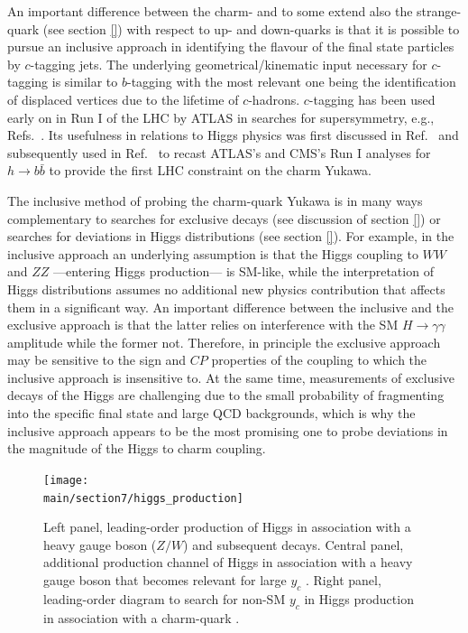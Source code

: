 \documentclass[../report.tex]{subfiles}
\providecommand{\main}{..}
\begin{document}
An important difference between the charm- and to some extend also 
the strange-quark (see section \ref{}) with respect to up- and 
down-quarks is that it is possible to pursue an inclusive approach in
identifying the flavour of the final state particles by $c$-tagging jets.
The underlying geometrical/kinematic input necessary for $c$-tagging
is similar to $b$-tagging with the most relevant one being the identification
of displaced vertices due to the lifetime of $c$-hadrons.
$c$-tagging has been used early on in Run I of the LHC by ATLAS in 
searches for supersymmetry, e.g., Refs.~\cite{Aad:2014nra,Aad:2015gna}.
Its usefulness in relations to Higgs physics was first discussed 
in Ref.~\cite{Delaunay:2013pja} and subsequently
used in Ref.~\cite{Perez:2015aoa} to recast ATLAS's and CMS's Run I 
analyses for $h\to b\bar b$ to provide the first LHC 
constraint on the charm Yukawa. 

The inclusive method of probing the charm-quark Yukawa is in many ways complementary 
to searches for exclusive decays (see discussion of section \ref{}) or 
searches for deviations in Higgs distributions (see section \ref{}).
For example, in the inclusive approach an underlying assumption is 
that the Higgs coupling to $WW$ and $ZZ$ ---entering Higgs production--- is SM-like,
while the interpretation of Higgs distributions
assumes no additional new physics contribution that affects them in a significant way.
An important difference between the inclusive and the exclusive approach 
is that the latter relies on interference with the SM $H\to \gamma\gamma$ 
amplitude while the former not.
Therefore, in principle the exclusive approach may be sensitive to the sign and 
$CP$ properties of the coupling to which the inclusive approach is insensitive to.
At the same time, measurements of exclusive decays of the Higgs are challenging due 
to the small probability of fragmenting into the specific final state and 
large QCD backgrounds, which is why the inclusive approach appears to be the most promising
one to probe deviations in the magnitude of the Higgs to charm coupling.

\begin{figure}[h]
	\centering
	\texttt{[image: \\main/section7/higgs\_production]}
	\caption{Left panel, leading-order production of Higgs in association with a heavy gauge boson ($Z/W$) and 
		subsequent decays. Central panel, additional production channel of Higgs in association 
		with a heavy gauge boson that becomes relevant for large $y_c$ \cite{Perez:2015aoa}.
		Right panel, leading-order diagram to search for non-SM $y_c$ in Higgs production in 
		association with a charm-quark \cite{Brivio:2015fxa}.
	\label{fig:higgsproductionHcc}
	}
\end{figure}
\end{document}
